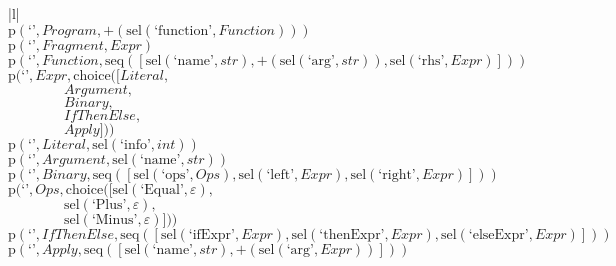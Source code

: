 \footnotesize\begin{center}\begin{tabular}{|l|}\hline
{}
\\\hline
$\mathrm{p}(\text{`'},\mathit{Program},\plus \left(\mathrm{sel}\left(\text{`function'},\mathit{Function}\right)\right))$	\\
$\mathrm{p}(\text{`'},\mathit{Fragment},\mathit{Expr})$	\\
$\mathrm{p}(\text{`'},\mathit{Function},\mathrm{seq}\left(\left[\mathrm{sel}\left(\text{`name'},str\right), \plus \left(\mathrm{sel}\left(\text{`arg'},str\right)\right), \mathrm{sel}\left(\text{`rhs'},\mathit{Expr}\right)\right]\right))$	\\
$\mathrm{p}(\text{`'},\mathit{Expr},\mathrm{choice}([\mathit{Literal},$\\$\qquad\qquad\mathit{Argument},$\\$\qquad\qquad\mathit{Binary},$\\$\qquad\qquad\mathit{IfThenElse},$\\$\qquad\qquad\mathit{Apply}]))$	\\
$\mathrm{p}(\text{`'},\mathit{Literal},\mathrm{sel}\left(\text{`info'},int\right))$	\\
$\mathrm{p}(\text{`'},\mathit{Argument},\mathrm{sel}\left(\text{`name'},str\right))$	\\
$\mathrm{p}(\text{`'},\mathit{Binary},\mathrm{seq}\left(\left[\mathrm{sel}\left(\text{`ops'},\mathit{Ops}\right), \mathrm{sel}\left(\text{`left'},\mathit{Expr}\right), \mathrm{sel}\left(\text{`right'},\mathit{Expr}\right)\right]\right))$	\\
$\mathrm{p}(\text{`'},\mathit{Ops},\mathrm{choice}([\mathrm{sel}\left(\text{`Equal'},\varepsilon\right),$\\$\qquad\qquad\mathrm{sel}\left(\text{`Plus'},\varepsilon\right),$\\$\qquad\qquad\mathrm{sel}\left(\text{`Minus'},\varepsilon\right)]))$	\\
$\mathrm{p}(\text{`'},\mathit{IfThenElse},\mathrm{seq}\left(\left[\mathrm{sel}\left(\text{`ifExpr'},\mathit{Expr}\right), \mathrm{sel}\left(\text{`thenExpr'},\mathit{Expr}\right), \mathrm{sel}\left(\text{`elseExpr'},\mathit{Expr}\right)\right]\right))$	\\
$\mathrm{p}(\text{`'},\mathit{Apply},\mathrm{seq}\left(\left[\mathrm{sel}\left(\text{`name'},str\right), \plus \left(\mathrm{sel}\left(\text{`arg'},\mathit{Expr}\right)\right)\right]\right))$	\\
\hline\end{tabular}\end{center}



